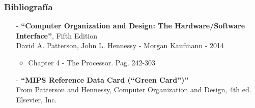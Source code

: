 \documentclass[aspectratio=169]{beamer}
\begin{document}
\begin{frame}[fragile]
    \frametitle{Bibliografía}
    \begin{itemize}
    \setlength\itemsep{0.4cm}
    \item[-] \textbf{``Computer Organization and Design: The Hardware/Software Interface''}, Fifth Edition\\
    David A. Patterson, John L. Hennessy - Morgan Kaufmann - 2014\\
    \begin{itemize}
     \item Chapter 4 - The Processor. Pag. 242-303
    \end{itemize}
    \item[-] \textbf{``MIPS Reference Data Card (“Green Card”)''}\\
    From Patterson and Hennessy, Computer Organization and Design, 4th ed.\\
    Elsevier, Inc.
    \end{itemize}
\end{frame}
\end{document}
